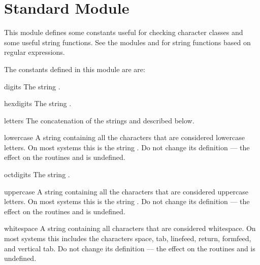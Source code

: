 \section{Standard Module }


This module defines some constants useful for checking character
classes and some useful string functions.  See the modules
 and  for string functions based on regular
expressions.

The constants defined in this module are are:

\renewcommand{\indexsubitem}{(data in module string)}
\begin{datadesc}{digits}
  The string .
\end{datadesc}

\begin{datadesc}{hexdigits}
  The string .
\end{datadesc}

\begin{datadesc}{letters}
  The concatenation of the strings  and
   described below.
\end{datadesc}

\begin{datadesc}{lowercase}
  A string containing all the characters that are considered lowercase
  letters.  On most systems this is the string
  .  Do not change its definition ---
  the effect on the routines  and  is
  undefined.
\end{datadesc}

\begin{datadesc}{octdigits}
  The string .
\end{datadesc}

\begin{datadesc}{uppercase}
  A string containing all the characters that are considered uppercase
  letters.  On most systems this is the string
  .  Do not change its definition ---
  the effect on the routines  and  is
  undefined.
\end{datadesc}

\begin{datadesc}{whitespace}
  A string containing all characters that are considered whitespace.
  On most systems this includes the characters space, tab, linefeed,
  return, formfeed, and vertical tab.  Do not change its definition ---
  the effect on the routines  and  is
  undefined.
\end{datadesc}

